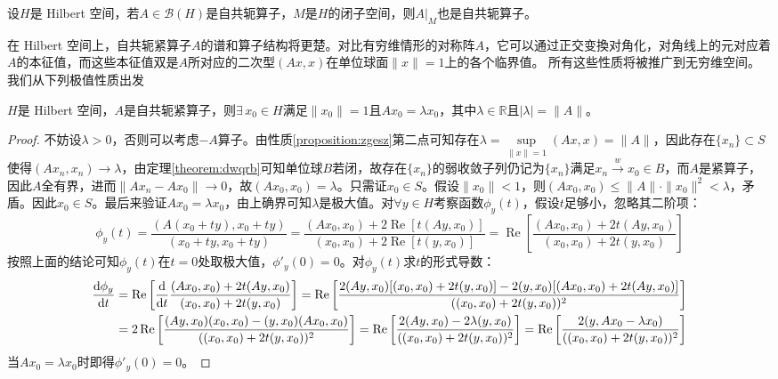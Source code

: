 \begin{theorem}\label{label:zkjzge}
设$H$是 Hilbert 空间，若$A\in\mathscr{B}(H)$是自共轭算子，$M$是$H$的闭子空间，则$A|_M$也是自共轭算子。
\end{theorem}
在 Hilbert 空间上，自共轭紧算子$A$的谱和算子结构将更楚。对比有穷维情形的对称阵$A$，它可以通过正交变換对角化，对角线上的元对应着$A$的本征值，而这些本征值双是$A$所对应的二次型$(Ax,x)$在单位球面$\|x\|=1$上的各个临界值。 所有这些性质将被推广到无穷维空间。我们从下列极值性质出发
\begin{theorem}\label{label:zgejz}
$H$是 Hilbert 空间，$A$是自共轭紧算子，则$\exists \, x_0 \in H$满足$\|x_0\|=1$且$Ax_0=\lambda x_0$，其中$\lambda\in\mathbb{R}$且$|\lambda|=\|A\|$。
\end{theorem}
\begin{proof}
不妨设$\lambda>0$，否则可以考虑$-A$算子。由性质\ref{proposition:zgesz}第二点可知存在$\lambda=\sup\limits_{\|x\|=1}(Ax,x)=\|A\|$，因此存在$\{x_n\} \subset S$使得$(Ax_n,x_n) \to \lambda$，由定理\ref{theorem:dwqrb}可知单位球$B$若闭，故存在$\{x_n\}$的弱收敛子列仍记为$\{x_n\}$满足$x_n \xrightarrow{w} x_0 \in B$，而$A$是紧算子，因此$A$全有界，进而$\|Ax_n-Ax_0\| \to 0$，故$(Ax_0,x_0)=\lambda$。只需证$x_0 \in S$。假设$\|x_0\|<1$，则$(Ax_0,x_0) \leq \|A\|\cdot\|x_0\|^2<\lambda$，矛盾。因此$x_0 \in S$。最后来验证$Ax_0=\lambda x_0$，由上确界可知$\lambda$是极大值。对$\forall y \in H$考察函数$\phi_y(t)$，假设$t$足够小，忽略其二阶项：
\[\phi_y(t)=\frac{(A(x_0+ty),x_0+ty)}{(x_0+ty,x_0+ty)}=\frac{(Ax_0,x_0)+2\operatorname{Re}[t(Ay,x_0)]}{(x_0,x_0)+2\operatorname{Re}[t(y,x_0)]}=\operatorname{Re}\left[\frac{(Ax_0,x_0)+2t(Ay,x_0)}{(x_0,x_0)+2t(y,x_0)}\right]\]
按照上面的结论可知$\phi_y(t)$在$t=0$处取极大值，$\phi'_y(0)=0$。对$\phi_y(t)$求$t$的形式导数：
\[\begin{aligned}
\dv{\phi_y}{t}&=\operatorname{Re}\left[\dv{t}\frac{(Ax_0,x_0)+2t(Ay,x_0)}{(x_0,x_0)+2t(y,x_0)}\right]=\operatorname{Re}\left[\frac{2(Ay,x_0)[(x_0,x_0)+2t(y,x_0)]-2(y,x_0)[(Ax_0,x_0)+2t(Ay,x_0)]}{((x_0,x_0)+2t(y,x_0))^2}\right]\\
&=2\operatorname{Re}\left[\frac{(Ay,x_0)(x_0,x_0)-(y,x_0)(Ax_0,x_0)}{((x_0,x_0)+2t(y,x_0))^2}\right]=\operatorname{Re}\left[\frac{2(Ay,x_0)-2\lambda(y,x_0)}{((x_0,x_0)+2t(y,x_0))^2}\right]=\operatorname{Re}\left[\frac{2(y,Ax_0-\lambda x_0)}{((x_0,x_0)+2t(y,x_0))^2}\right]
\end{aligned}\]
当$Ax_0=\lambda x_0$时即得$\phi'_y(0)=0$。
\end{proof}

